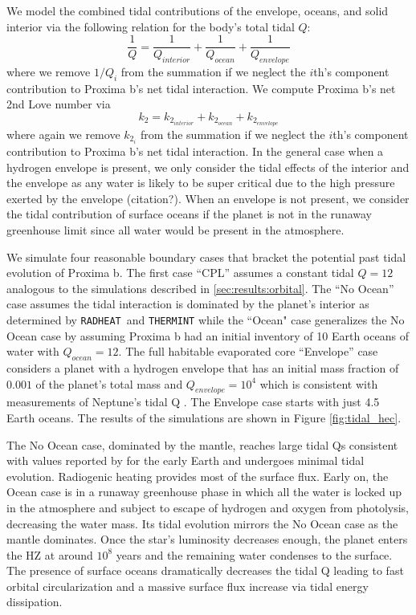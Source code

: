 \documentclass[preprint,12pt]{aastex}
\newcommand{\xxx}[1]{{\color{red} #1}} %
\def\radheat{\texttt{\footnotesize{RADHEAT}}\xspace}
\def\thermint{\texttt{\footnotesize{THERMINT}}\xspace}
\begin{document}
We model the combined tidal contributions of the envelope, oceans, and solid interior via the following relation for the body's total tidal $Q$:
\begin{equation}
\label{eqn:Q_hec}
\frac{1}{Q} = \frac{1}{Q_{interior}} + \frac{1}{Q_{ocean}} +
\frac{1}{Q_{envelope}}
\end{equation}
where we remove $1/Q_i$ from the summation if we neglect the $i$th's
component contribution to Proxima b's net tidal interaction.  We
compute Proxima b's net 2nd Love number via
\begin{equation}
\label{eqn:k2_hec}
k_2 = k_{2_{interior}} + k_{2_{ocean}}+ k_{2_{envelope}}
\end{equation}
where again we remove $k_{2_{i}}$ from the summation if we neglect the
$i$th's component contribution to Proxima b's net tidal interaction.
In the general case when a hydrogen envelope is present, we only
consider the tidal effects of the interior and the envelope as any
water is likely to be super critical due to the high pressure exerted
by the envelope \xxx{(citation?)}.  When an envelope is not present,
we consider the tidal contribution of surface oceans if the planet is
not in the runaway greenhouse limit since all water would be present
in the atmosphere.

We simulate four reasonable boundary cases that bracket the potential
past tidal evolution of Proxima b.  The first case ``CPL'' assumes a
constant tidal $Q = 12$ analogous to the simulations described in \ref{sec:results:orbital}.
  The ``No Ocean'' case assumes the tidal interaction
is dominated by the planet's interior as determined by \radheat \ and
\thermint while the ``Ocean" case generalizes the No Ocean case
by assuming Proxima b had an initial inventory of 10 Earth oceans of water with
$Q_{ocean} = 12$.  The full habitable evaporated core ``Envelope''
case considers a planet with a hydrogen envelope that has an
initial mass fraction of $0.001$ of the planet's total mass and
$Q_{envelope} = 10^4$ which is consistent with measurements of
Neptune's tidal Q \citep{ZhangHamilton08}.  The Envelope case
starts with just 4.5 Earth oceans.  The results of the simulations are
shown in Figure \ref{fig:tidal_hec}.

The No Ocean case, dominated by the mantle, reaches large tidal Qs
consistent with values reported by \cite{Zahnle15} for the early Earth
and undergoes minimal tidal evolution.  Radiogenic heating provides
most of the surface flux.  Early on, the Ocean case is in a runaway
greenhouse phase in which all the water is locked up in the atmosphere
and subject to escape of hydrogen and oxygen from photolysis,
decreasing the water mass.  Its tidal evolution mirrors the No Ocean
case as the mantle dominates.  Once the star's luminosity decreases
enough, the planet enters the HZ at around $10^8$ years and the
remaining water condenses to the surface. The presence of surface
oceans dramatically decreases the tidal Q leading to fast orbital
circularization and a massive surface flux increase via tidal energy
dissipation.
\end{document}
